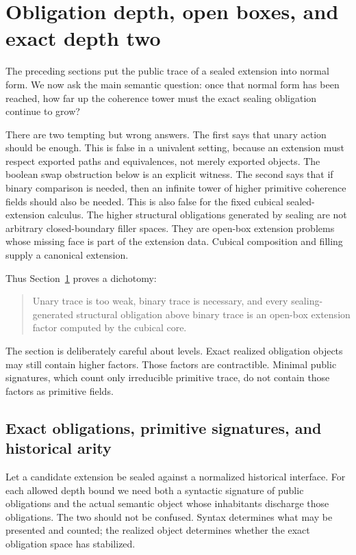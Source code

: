 \documentclass{lmcs}
\begin{document}
\section{Obligation depth, open boxes, and exact depth two}
\label{sec:depth-two}

The preceding sections put the public trace of a sealed extension into normal form.  We now
ask the main semantic question: once that normal form has been reached, how far up the
coherence tower must the exact sealing obligation continue to grow?

There are two tempting but wrong answers.  The first says that unary action should be
enough.  This is false in a univalent setting, because an extension must respect exported
paths and equivalences, not merely exported objects.  The boolean swap obstruction below is
an explicit witness.  The second says that if binary comparison is needed, then an infinite
tower of higher primitive coherence fields should also be needed.  This is also false for the
fixed cubical sealed-extension calculus.  The higher structural obligations generated by
sealing are not arbitrary closed-boundary filler spaces.  They are open-box extension
problems whose missing face is part of the extension data.  Cubical composition and filling
supply a canonical extension.

Thus Section~\ref{sec:depth-two} proves a dichotomy:
\begin{quote}
Unary trace is too weak, binary trace is necessary, and every sealing-generated structural
obligation above binary trace is an open-box extension factor computed by the cubical core.
\end{quote}

The section is deliberately careful about levels.  Exact realized obligation objects may
still contain higher factors.  Those factors are contractible.  Minimal public signatures,
which count only irreducible primitive trace, do not contain those factors as primitive
fields.

\subsection{Exact obligations, primitive signatures, and historical arity}
\label{subsec:obligation-objects}

Let a candidate extension be sealed against a normalized historical interface.  For each
allowed depth bound we need both a syntactic signature of public obligations and the actual
semantic object whose inhabitants discharge those obligations.  The two should not be
confused.  Syntax determines what may be presented and counted; the realized object
determines whether the exact obligation space has stabilized.
\end{document}
